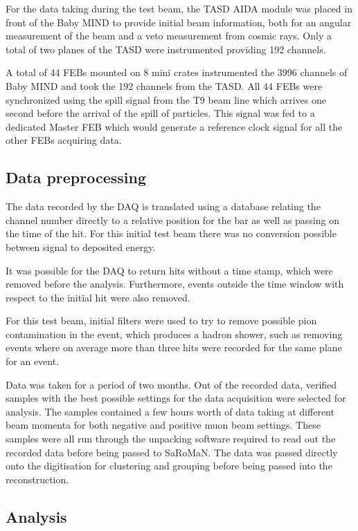 For the data taking during the test beam, the TASD AIDA module was placed in front of the Baby MIND to provide initial beam information, both for an angular measurement of the beam and a veto measurement from cosmic rays. Only a total of two planes of the TASD were instrumented providing 192 channels. 

A total of 44 FEBs mounted on 8 mini crates instrumented the 3996 channels of Baby MIND and took the 192 channels from the TASD. All 44 FEBs were synchronized using the spill signal from the T9 beam line which arrives one second before the arrival of the spill of particles. This signal was fed to a dedicated Master FEB which would generate a reference clock signal for all the other FEBs acquiring data.

\subsection{Data preprocessing}
The data recorded by the DAQ is translated using a database relating the channel number directly to a relative position for the bar as well as passing on the time of the hit. For this initial test beam there was no conversion possible between signal to deposited energy.

It was possible for the DAQ to return hits without a time stamp, which were removed before the analysis. Furthermore, events outside the time window with respect to the initial hit were also removed.

For this test beam, initial filters were used to try to remove possible pion contamination in the event, which produces a hadron shower, such as removing events where on average more than three hits were recorded for the same plane for an event. 

Data was taken for a period of two months. Out of the recorded data, verified samples with the best possible settings for the data acquisition were selected for analysis. The samples contained a few hours worth of data taking at different beam momenta for both negative and positive muon beam settings. These samples were all run through the unpacking software required to read out the recorded data before being passed to SaRoMaN. The data was passed directly onto the digitisation for clustering and grouping before being passed into the reconstruction.

\subsection{Analysis}

